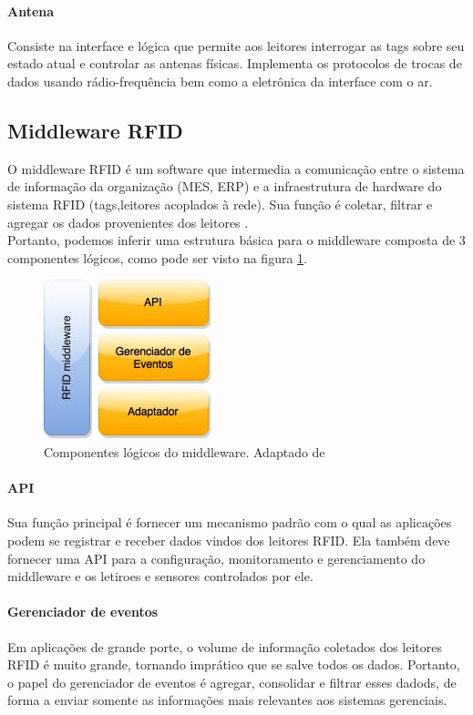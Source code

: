\documentclass[a4paper,12pt,titlepage]{article}
\begin{document}
	\paragraph{Antena} Consiste na interface e lógica que permite aos leitores interrogar as tags sobre seu estado atual e controlar as antenas físicas. Implementa os protocolos de trocas de dados usando rádio-frequência bem como a eletrônica da interface com o ar.

	
	\subsection{Middleware RFID}
	
	O middleware RFID é um software que intermedia a comunicação entre o sistema de informação da organização (MES, ERP) e a infraestrutura de hardware do sistema RFID (tags,leitores acoplados à rede). Sua função é coletar, filtrar e agregar os dados provenientes dos leitores \cite{renatarfid}. \\
	Portanto, podemos inferir uma estrutura básica para o middleware composta de 3 componentes lógicos, como pode ser visto na figura \ref{fig:middleware}.
		
		\begin{figure}[h!]
			\centering
			\includegraphics[width=0.25\linewidth]{middleware}
			\caption{Componentes lógicos do middleware. Adaptado de \cite{rfidbook}}
			\label{fig:middleware}
		\end{figure}
	
	\paragraph{API} Sua função principal é fornecer um mecanismo padrão com o qual as aplicações podem se registrar e receber dados vindos dos leitores RFID. Ela também deve fornecer uma API para a configuração, monitoramento e gerenciamento do middleware e os letiroes e sensores controlados por ele.
	\paragraph{Gerenciador de eventos} Em aplicações de grande porte, o volume de informação coletados dos leitores RFID é muito grande, tornando imprático que se salve todos os dados. Portanto, o papel do gerenciador de eventos é agregar, consolidar e filtrar esses dadods, de forma a enviar somente as informações mais relevantes aos sistemas gerenciais.
\end{document}
